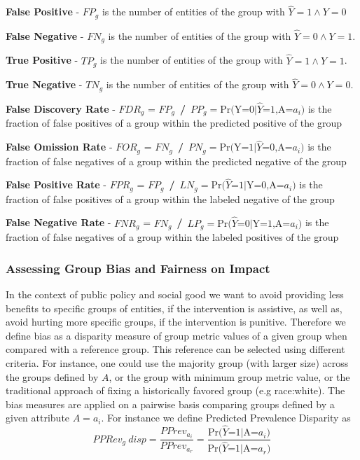 \textbf{False Positive}          - $FP_g$  is the number of entities of the group with $\widehat{Y}=1 \land Y=0$ 

\textbf{False Negative}          - $FN_g$ is the number of entities of the group with $\widehat{Y}=0 \land Y=1$. 

\textbf{True Positive}           - $TP_g$ is the number of entities of the group with  $\widehat{Y}=1 \land Y=1$. 

\textbf{True Negative}           - $TN_g$ is the number of entities of the group with  $\widehat{Y}=0 \land Y=0$.

\textbf{False Discovery Rate}    - $FDR_g$ = $FP_g$\ \textbf{/}\ $PP_g = \text{Pr(Y=0|}\widehat{Y}\text{=1,A=}a_i)$ is the fraction of false positives of a group within the predicted positive of the group

\textbf{False Omission Rate}     - $FOR_g$ = $FN_g$\ \textbf{/}\ $PN_g = \text{Pr(Y=1|}\widehat{Y}\text{=0,A=}a_i)$ is the fraction of false negatives of a group within the predicted negative of the group

\textbf{False Positive Rate}     - $FPR_g$ = $FP_g$\ \textbf{/}\ $LN_g  = \text{Pr(}\widehat{Y}\text{=1|Y=0,A=}a_i)$ is the fraction of false positives of a group within the labeled negative of the group

\textbf{False Negative Rate}     - $FNR_g$ = $FN_g$\ \textbf{/}\ $LP_g = \text{Pr(}\widehat{Y}\text{=0|Y=1,A=}a_i)$ is the fraction of false negatives of a group within the labeled positives of the group


\subsubsection{Assessing Group Bias and Fairness on Impact}
In the context of public policy and social good we want to avoid providing less benefits to specific groups of entities, if the intervention is assistive, as well as, avoid hurting more specific groups, if the intervention is punitive. Therefore we define bias as a disparity measure of group metric values of a given group when compared with a reference group. This reference can be selected using different criteria. For instance, one could use the majority group (with larger size) across the groups defined by $A$, or the group with minimum group metric value, or the traditional approach of fixing a historically favored group (e.g race:white).  The bias measures are applied on a pairwise basis comparing groups defined by a given attribute $A=a_i$. For instance we define Predicted Prevalence Disparity as
\begin{equation}
PPRev_g \ disp = \frac{PPrev_{a_i}}{PPrev_{a_r}} = \frac{\text{Pr(}\widehat{Y}\text{=1|A=}a_i)}{\text{Pr(}\widehat{Y}\text{=1|A=}a_r)}
\end{equation}

